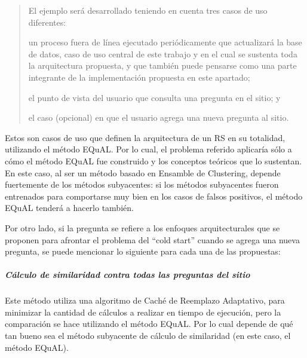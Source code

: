 \begin{quotation}
	El ejemplo será desarrollado teniendo en cuenta tres casos de uso diferentes: \begin{enumerate*} [label=(\roman*)] \item un proceso fuera de línea ejecutado periódicamente que actualizará la base de datos, caso de uso central de este trabajo y en el cual se sustenta toda la arquitectura propuesta, y que también puede pensarse como una parte integrante de la implementación propuesta en este apartado; \item el punto de vista del usuario que consulta una pregunta en el sitio; y \item el caso (opcional) en que el usuario agrega una nueva pregunta al sitio.\end{enumerate*}
\end{quotation}

\bigskip

Estos son casos de uso que definen la arquitectura de un RS en su totalidad, utilizando el método EQuAL. Por lo cual, el problema referido aplicaría sólo a cómo el método EQuAL fue construido y los conceptos teóricos que lo sustentan. En este caso, al ser un método basado en Ensamble de Clustering, depende fuertemente de los métodos subyacentes: si los métodos subyacentes fueron entrenados para comportarse muy bien en los casos de falsos positivos, el método EQuAL tenderá a hacerlo también.

\bigskip

Por otro lado, si la pregunta se refiere a los enfoques arquitecturales que se proponen para afrontar el problema del ``cold start'' cuando se agrega una nueva pregunta, se puede mencionar lo siguiente para cada una de las propuestas:

\subparagraph{Cálculo de similaridad contra todas las preguntas del sitio}
Este método utiliza una algoritmo de Caché de Reemplazo Adaptativo, para minimizar la cantidad de cálculos a realizar en tiempo de ejecución, pero la comparación se hace utilizando el método EQuAL. Por lo cual depende de qué tan bueno sea el método subyacente de cálculo de similaridad (en este caso, el método EQuAL).

